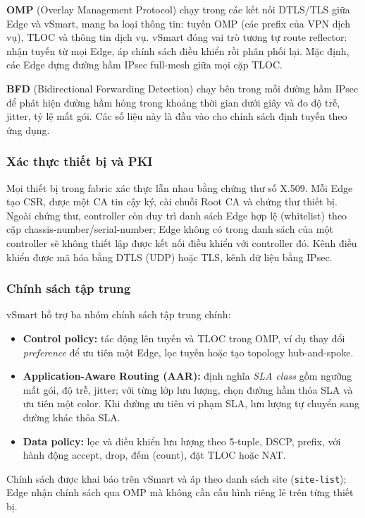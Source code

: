 \textbf{OMP} (Overlay Management Protocol) chạy trong các kết nối DTLS/TLS giữa Edge và vSmart, mang ba loại thông tin: tuyến OMP (các prefix của VPN dịch vụ), TLOC và thông tin dịch vụ. vSmart đóng vai trò tương tự route reflector: nhận tuyến từ mọi Edge, áp chính sách điều khiển rồi phân phối lại. Mặc định, các Edge dựng đường hầm IPsec full-mesh giữa mọi cặp TLOC.

\textbf{BFD} (Bidirectional Forwarding Detection) chạy bên trong mỗi đường hầm IPsec để phát hiện đường hầm hỏng trong khoảng thời gian dưới giây và đo độ trễ, jitter, tỷ lệ mất gói. Các số liệu này là đầu vào cho chính sách định tuyến theo ứng dụng.

\subsubsection{Xác thực thiết bị và PKI}

Mọi thiết bị trong fabric xác thực lẫn nhau bằng chứng thư số X.509. Mỗi Edge tạo CSR, được một CA tin cậy ký, cài chuỗi Root CA và chứng thư thiết bị. Ngoài chứng thư, controller còn duy trì danh sách Edge hợp lệ (whitelist) theo cặp chassis-number/serial-number; Edge không có trong danh sách của một controller sẽ không thiết lập được kết nối điều khiển với controller đó. Kênh điều khiển được mã hóa bằng DTLS (UDP) hoặc TLS, kênh dữ liệu bằng IPsec.

\subsubsection{Chính sách tập trung}

vSmart hỗ trợ ba nhóm chính sách tập trung chính:
\begin{itemize}
    \item \textbf{Control policy:} tác động lên tuyến và TLOC trong OMP, ví dụ thay đổi \textit{preference} để ưu tiên một Edge, lọc tuyến hoặc tạo topology hub-and-spoke.
    \item \textbf{Application-Aware Routing (AAR):} định nghĩa \textit{SLA class} gồm ngưỡng mất gói, độ trễ, jitter; với từng lớp lưu lượng, chọn đường hầm thỏa SLA và ưu tiên một color. Khi đường ưu tiên vi phạm SLA, lưu lượng tự chuyển sang đường khác thỏa SLA.
    \item \textbf{Data policy:} lọc và điều khiển lưu lượng theo 5-tuple, DSCP, prefix, với hành động accept, drop, đếm (count), đặt TLOC hoặc NAT.
\end{itemize}

Chính sách được khai báo trên vSmart và áp theo danh sách site (\texttt{site-list}); Edge nhận chính sách qua OMP mà không cần cấu hình riêng lẻ trên từng thiết bị.


